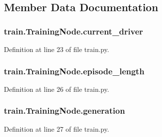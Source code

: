 \subsection{Member Data Documentation}
\subsubsection[{\texorpdfstring{current\+\_\+driver}{current_driver}}]{\setlength{\rightskip}{0pt plus 5cm}train.\+Training\+Node.\+current\+\_\+driver}\hypertarget{classtrain_1_1_training_node_a81d0481151f7b23e6489027fa1a87e47}{}\label{classtrain_1_1_training_node_a81d0481151f7b23e6489027fa1a87e47}


Definition at line 23 of file train.\+py.

\subsubsection[{\texorpdfstring{episode\+\_\+length}{episode_length}}]{\setlength{\rightskip}{0pt plus 5cm}train.\+Training\+Node.\+episode\+\_\+length}\hypertarget{classtrain_1_1_training_node_a58926a0e5681d22983ca345ebb7771bd}{}\label{classtrain_1_1_training_node_a58926a0e5681d22983ca345ebb7771bd}


Definition at line 26 of file train.\+py.

\subsubsection[{\texorpdfstring{generation}{generation}}]{\setlength{\rightskip}{0pt plus 5cm}train.\+Training\+Node.\+generation}\hypertarget{classtrain_1_1_training_node_a3ba5470e3146e9bb1303ed906b868d28}{}\label{classtrain_1_1_training_node_a3ba5470e3146e9bb1303ed906b868d28}


Definition at line 27 of file train.\+py.

